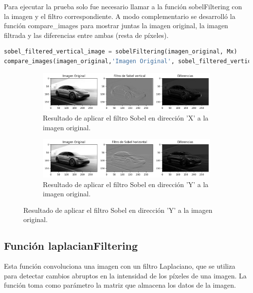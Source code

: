 \documentclass{article}
\begin{document}
    \noindent
    Para ejecutar la prueba solo fue necesario llamar a la función sobelFiltering con la imagen y el filtro correspondiente.
    A modo complementario se desarrolló la función compare\_images para mostrar juntas la imagen original, la imagen filtrada y las diferencias entre ambas (resta de píxeles).
    
    \begin{lstlisting}[language=Python, caption={Ejecutando sobelFiltering},label={lst:compareImages}]
sobel_filtered_vertical_image = sobelFiltering(imagen_original, Mx)
compare_images(imagen_original,'Imagen Original', sobel_filtered_vertical_image, 'Filtro de Sobel vertical')
    \end{lstlisting}
    
    \begin{figure}[!ht]
        \centering
        \begin{subfigure}
            \centering
            \includegraphics[width=\linewidth]{img/sobelx}
            \caption{ Resultado de aplicar el filtro Sobel en dirección 'X' a la imagen original.}
            \label{fig:sobelx}
        \end{subfigure}
        \begin{subfigure}
            \centering
            \includegraphics[width=\linewidth]{img/sobely}
            \caption{ Resultado de aplicar el filtro Sobel en dirección 'Y' a la imagen original.}
            \label{fig:sobely}
        \end{subfigure}
    \end{figure}
    
    \noindent
    \clearpage
    
    \subsection{Función laplacianFiltering}\label{subsec:funcion-laplacianfiltering}
    Esta función convoluciona una imagen con un filtro Laplaciano, que se utiliza para detectar cambios abruptos en la intensidad de los píxeles de una imagen.
    La función toma como parámetro la matriz que almacena los datos de la imagen.
    
\end{document}
